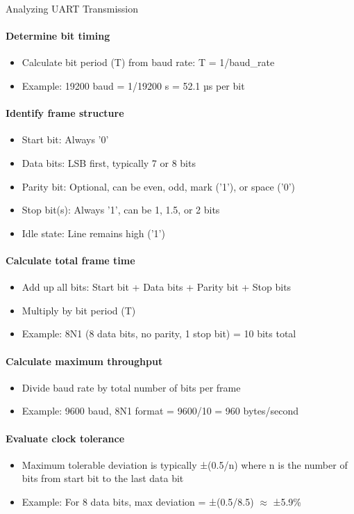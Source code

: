 \begin{KR}{Analyzing UART Transmission}
\paragraph{Determine bit timing}
\begin{itemize}
    \item Calculate bit period (T) from baud rate: T = 1/baud\_rate
    \item Example: 19200 baud = 1/19200 s = 52.1 µs per bit
\end{itemize}

\paragraph{Identify frame structure}
\begin{itemize}
    \item Start bit: Always '0'
    \item Data bits: LSB first, typically 7 or 8 bits
    \item Parity bit: Optional, can be even, odd, mark ('1'), or space ('0')
    \item Stop bit(s): Always '1', can be 1, 1.5, or 2 bits
    \item Idle state: Line remains high ('1')
\end{itemize}

\paragraph{Calculate total frame time}
\begin{itemize}
    \item Add up all bits: Start bit + Data bits + Parity bit + Stop bits
    \item Multiply by bit period (T)
    \item Example: 8N1 (8 data bits, no parity, 1 stop bit) = 10 bits total
\end{itemize}

\paragraph{Calculate maximum throughput}
\begin{itemize}
    \item Divide baud rate by total number of bits per frame
    \item Example: 9600 baud, 8N1 format = 9600/10 = 960 bytes/second
\end{itemize}

\paragraph{Evaluate clock tolerance}
\begin{itemize}
    \item Maximum tolerable deviation is typically ±(0.5/n) where n is the number of bits from start bit to the last data bit
    \item Example: For 8 data bits, max deviation = ±(0.5/8.5) $\approx$ ±5.9\%
\end{itemize}
\end{KR}

